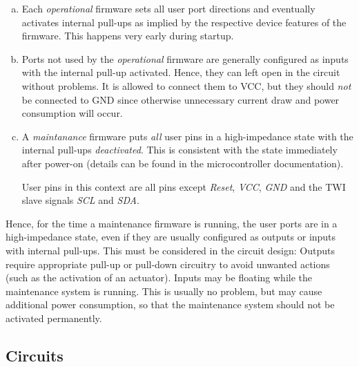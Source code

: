 \documentclass[12pt,english,parskip=half,headheight=19pt]{scrreprt}
\begin{document}
\begin{enumerate}[a)]

  \item
    Each \textit{operational} firmware sets all user port directions and eventually activates 
    internal pull-ups as implied by the respective device features of the firmware.
    This happens very early during startup.

  \item
    Ports not used by the \textit{operational} firmware are generally configured as inputs with the
    internal pull-up activated. Hence, they can left open in the circuit without problems. It is
    allowed to connect them to VCC, but they should \textit{not} be connected to GND since otherwise
    unnecessary current draw and power consumption will occur.

  \item
    A \textit{maintanance} firmware puts \textit{all} user pins in a high-impedance state
    with the internal pull-ups \textit{deactivated}. This is consistent with the state immediately
    after power-on (details can be found in the microcontroller documentation).

    User pins in this context are all pins except \textit{Reset}, \textit{VCC}, \textit{GND} and the
    TWI slave signals \textit{SCL} and \textit{SDA}.

\end{enumerate}

Hence, for the time a maintenance firmware is running, the user ports are in a high-impedance state, even if they are usually configured as outputs or inputs with internal pull-ups. This must be considered in the circuit design: Outputs require appropriate pull-up or pull-down circuitry to avoid unwanted actions (such as the activation of an actuator). Inputs may be floating while the maintenance system is running. This is usually no problem, but may cause additional power consumption, so that the maintenance system should not be activated permanently.



\subsection{Circuits}
\end{document}
